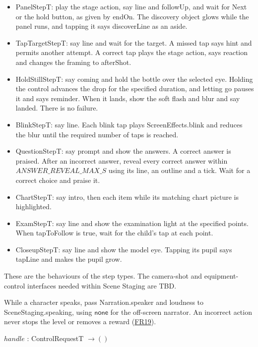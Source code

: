\documentclass[10pt, titlepage]{article}
\newcommand{\srsurl}{https://team-hindsight.github.io/ophthamology-game/SRS/SRS.pdf}
\newcommand{\srsitemref}[2]{\href{\srsurl\#nameddest=#1}{#2}}
\newcommand{\T}[1]{\mathit{#1}}          %
\newcommand{\V}[1]{\mathsf{#1}}          %
\begin{document}
\begin{itemize}
\item PanelStepT: play the stage action, say line and followUp, and
  wait for Next or the hold button, as given by endOn. The discovery
  object glows while the panel runs, and tapping it says discoverLine as an aside.
\item TapTargetStepT: say line and wait for the target. A missed tap
  says hint and permits another attempt. A correct tap plays the
  stage action, says reaction and changes the framing to afterShot.
\item HoldStillStepT: say coming and hold the bottle over the selected eye. Holding
  the control advances the drop for the specified duration, and letting
  go pauses it and says reminder. When it lands, show the soft flash
  and blur and say landed. There is no failure.
\item BlinkStepT: say line. Each blink tap plays ScreenEffects.blink
  and reduces the blur until the required number of taps is reached.
\item QuestionStepT: say prompt and show the answers. A correct
  answer is praised. After an incorrect answer, reveal every correct
  answer within $\T{ANSWER\_REVEAL\_MAX\_S}$ using its line, an
  outline and a tick. Wait for a correct choice and praise it.
\item ChartStepT: say intro, then each item while its matching chart
  picture is highlighted.
\item ExamStepT: say line and show the examination light at the specified points.
  When tapToFollow is true, wait for the child's tap at each point.
\item CloseupStepT: say line and show the model eye. Tapping its pupil says
  tapLine and makes the pupil grow.
\end{itemize}

These are the behaviours of the step types. The camera-shot
and equipment-control interfaces needed within Scene Staging are TBD.

While a character speaks, pass Narration.speaker and loudness to
SceneStaging.speaking, using $\V{none}$ for the off-screen narrator.
An incorrect action never stops the level or removes a reward
(\srsitemref{FR_NoPenalty}{FR19}).

\noindent $\T{handle}$ : ControlRequestT $\to ()$
\end{document}
